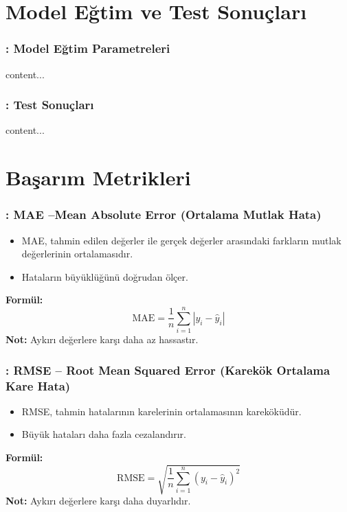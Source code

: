 \documentclass[12pt]{beamer}
\begin{document}
\section{Model Eğtim ve Test Sonuçları}
\begin{frame}
	\frametitle{\insertsection: Model Eğtim Parametreleri}
	content...
\end{frame}

\begin{frame}
	\frametitle{\insertsection: Test Sonuçları}
	content...
\end{frame}

\section{Başarım Metrikleri}
\begin{frame}
	\frametitle{\insertsection:  MAE –Mean Absolute Error (Ortalama Mutlak
		Hata)}
	\begin{itemize}
		\item MAE, tahmin edilen değerler ile gerçek değerler
		      arasındaki farkların mutlak değerlerinin ortalamasıdır.
		\item Hataların büyüklüğünü doğrudan ölçer.
	\end{itemize}
	\vspace{0.5cm}
	\textbf{Formül:}
	\[
		\text{MAE} = \frac{1}{n} \sum_{i=1}^{n} \left| y_i - \hat{y}_i \right|
	\]
	\vspace{0.3cm}
	\textbf{Not:} Aykırı değerlere karşı daha az hassastır.
\end{frame}

\begin{frame}
	\frametitle{\insertsection: RMSE – Root Mean Squared Error (Karekök
		Ortalama Kare Hata)}
	\begin{itemize}
		\item RMSE, tahmin hatalarının karelerinin ortalamasının
		      kareköküdür.
		\item Büyük hataları daha fazla cezalandırır.
	\end{itemize}
	\vspace{0.5cm}
	\textbf{Formül:}
	\[
		\text{RMSE} = \sqrt{ \frac{1}{n} \sum_{i=1}^{n} \left( y_i - \hat{y}_i
			\right)^2 }
	\]
	\vspace{0.3cm}
	\textbf{Not:} Aykırı değerlere karşı daha duyarlıdır.
\end{frame}
\end{document}

